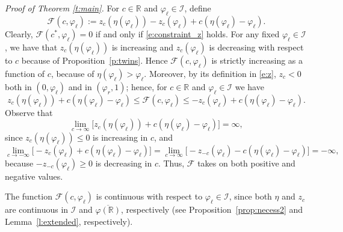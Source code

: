 \documentclass[11pt,a4paper]{article}
\newcommand{\R}{\mathbb R}
\renewcommand{\phi}{\varphi}
\newenvironment{proofof}[1]{\smallskip\noindent\emph{Proof of #1.}%
\hspace{1pt}}{\hspace{-5pt}{\nobreak\quad\nobreak\hfill\nobreak%
$\square$\vspace{8pt}\par}\smallskip\goodbreak}
\begin{document}
\begin{proofof}{Theorem \ref{t:main}}
For $c \in \mathbb{R}$ and $\varphi_\ell \in \mathcal I$, define
\begin{equation}\label{e:mathcalF}
\mathcal F(c,\varphi_\ell)
:= z_c\left(\eta(\varphi_\ell)\right) - z_c(\varphi_\ell)
   + c\left(\eta(\varphi_\ell) - \varphi_\ell\right).
\end{equation}
Clearly, $\mathcal F(c^*,\varphi_\ell) = 0$ if and only if \eqref{e:constraint_z} holds.
For any fixed $\varphi_\ell \in \mathcal I$, we have that $z_c(\eta(\varphi_\ell))$ is increasing and $z_c(\varphi_\ell)$ is decreasing with respect to  $c$ because of Proposition~\ref{p:twins}.  
Hence $\mathcal F(c,\varphi_\ell)$ is strictly increasing as a function of $c$, because of $\eta(\varphi_\ell)>\varphi_\ell$.
Moreover, by its definition in \eqref{e:z},  $z_c<0$ both in $(0, \phi_{\ell})$ and in $(\phi_r, 1)$; hence, for $c \in \mathbb{R}$ and $\varphi_\ell \in \mathcal I$ we have
\[
z_c(\eta(\varphi_\ell)) + c(\eta(\varphi_\ell) - \varphi_\ell)
\le \mathcal F(c, \varphi_\ell)
\le -z_c(\varphi_\ell) + c(\eta(\varphi_\ell) - \varphi_\ell).
\]
Observe that
\[
\lim_{c \to \infty} 
\big[z_c(\eta(\varphi_\ell)) + c(\eta(\varphi_\ell) - \varphi_\ell)\big] = \infty,
\]
since $z_c(\eta(\varphi_\ell)) \le 0$ is increasing in $c$, and
\[
\lim_{c \to -\infty} 
\big[-z_c(\varphi_\ell) + c(\eta(\varphi_\ell) - \varphi_\ell)\big]
= \lim_{c \to \infty} \big[-z_{-c}(\varphi_\ell) - c(\eta(\varphi_\ell) - \varphi_\ell)\big]
= -\infty,
\]
because $-z_{-c}(\varphi_\ell) \ge 0$ is decreasing in $c$.  
Thus, $\mathcal F$ takes on both positive and negative values.

The function $\mathcal F(c,\varphi_\ell)$ is continuous with respect to $\varphi_\ell\in\mathcal{I}$, since both $\eta$ and $z_c$ are continuous in $\mathcal{I}$ and $\overline{\phi(\R)}$, respectively (see Proposition~\ref{prop:necess2} and Lemma~\ref{l:extended}, respectively).  


\end{proofof}
\end{document}
